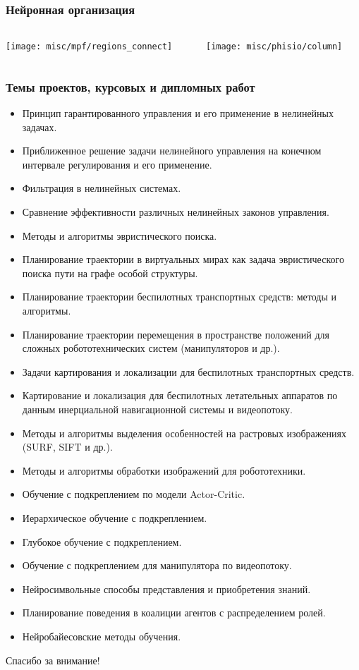 \documentclass[12pt]{beamer}
\begin{document}
	\begin{frame}
		\frametitle{Нейронная организация}
		
		\begin{columns}
		\begin{column}{0.65\textwidth}
		\texttt{[image: misc/mpf/regions\_connect]}
		\end{column}
		\begin{column}{0.35\textwidth}
		\texttt{[image: misc/phisio/column]}
		\end{column}
		\end{columns}

	\end{frame}
\begin{frame}
\frametitle{Темы проектов, курсовых и дипломных работ}
\tiny
\begin{itemize}
	\item Принцип гарантированного управления и его применение в нелинейных задачах.
	\item Приближенное решение задачи нелинейного управления на конечном интервале регулирования и его применение.
	\item Фильтрация в нелинейных системах.
	\item Сравнение эффективности различных нелинейных законов управления.
	
	\item Методы и алгоритмы эвристического поиска.
	\item Планирование траектории в виртуальных мирах как задача эвристического поиска пути на графе особой структуры.
	\item Планирование траектории беспилотных транспортных средств: методы и алгоритмы.
	\item Планирование траектории перемещения в пространстве положений для сложных робототехнических систем (манипуляторов и др.).
	\item Задачи картирования и локализации для беспилотных транспортных средств.
	\item Картирование и локализация для беспилотных летательных аппаратов по данным инерциальной навигационной системы и видеопотоку.
	\item Методы и алгоритмы выделения особенностей на растровых изображениях (SURF, SIFT  и др.).
	\item Методы и алгоритмы обработки изображений для робототехники.
	
	\item Обучение с подкреплением по модели Actor-Critic.
	\item Иерархическое обучение с подкреплением.
	\item Глубокое обучение с подкреплением.
	\item Обучение с подкреплением для манипулятора по видеопотоку.
	\item Нейросимвольные способы представления и приобретения знаний.
	\item Планирование поведения в коалиции агентов с распределением ролей.
	\item Нейробайесовские методы обучения.
	
\end{itemize}
\end{frame}

\begin{frame}

\centering
Спасибо за внимание!

\end{frame}
\end{document}
